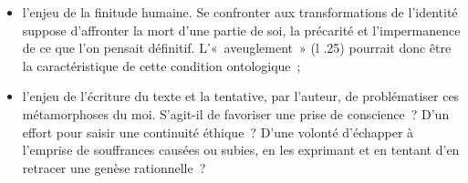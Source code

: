 {\begin{itemize}
\item l'enjeu de la finitude humaine. Se confronter aux transformations de l'identité suppose
d'affronter la mort d'une partie de soi, la précarité et l'impermanence de ce que l'on
pensait définitif. L'«~aveuglement~» (l .25) pourrait donc être la caractéristique de cette
condition ontologique~;

\item l'enjeu de l'écriture du texte et la tentative, par l'auteur, de problématiser ces
métamorphoses du moi. S'agit-il de favoriser une prise de conscience~? D'un effort
pour saisir une continuité éthique~? D'une volonté d'échapper à l'emprise de
souffrances causées ou subies, en les exprimant et en tentant d'en retracer une
genèse rationnelle~?

\end{itemize}}%
